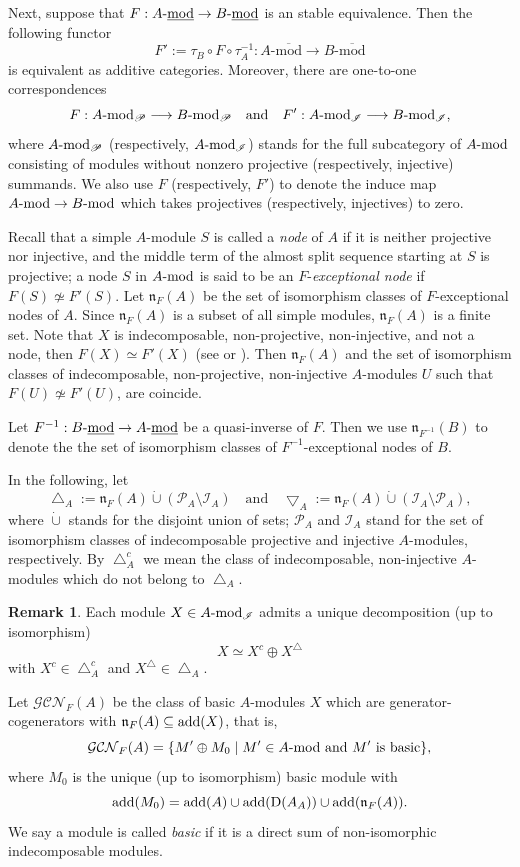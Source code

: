 \documentclass[12pt]{article}
\numberwithin{equation}{section}
\theoremstyle{definition}
\newtheorem{Rem}[Def]{Remark}
\newcommand{\add}{{\rm add}}
\newcommand{\DD}{{\rm D}}
\newcommand{\modcat}{\ensuremath{\mbox{{\rm -mod}}}}
\newcommand{\stmodcat}[1]{#1\mbox{{\rm -{\underline{mod}}}}}
\newcommand{\lra}{\longrightarrow}
\newcommand{\ra}{\rightarrow}
\begin{document}
Next, suppose that $F: \stmodcat{A} \ra \stmodcat{B}$ is an stable equivalence. Then the following functor
$$F':=\tau_B\circ F\circ \tau_A^{-1}:A\mbox{-}\overline{\mbox{mod}}\lra B\mbox{-}\overline{\mbox{mod}}$$
is equivalent as additive categories. Moreover, there are one-to-one correspondences
$$F: A\modcat_{\mathscr{P}}\lra B\modcat_{\mathscr{P}}\quad \mbox{and}\quad
F': A\modcat_{\mathscr{I}}\lra  B\modcat_{\mathscr{I}},$$
where $A\modcat_{\mathscr{P}}$ (respectively, $A\modcat_{\mathscr{I}}$) stands for the full subcategory of $A\modcat$ consisting of modules without nonzero projective (respectively, injective) summands.
We also use $F$ (respectively, $F'$) to denote the induce map $A\modcat\ra B\modcat$ which takes projectives (respectively, injectives) to zero.

Recall that a simple $A$-module $S$ is called a \emph{node} of $A$ if it is  neither projective nor injective, and the middle term of the almost split sequence starting at $S$ is projective; a node $S$ in $A\modcat$ is said to be an $F$-\emph{exceptional node} if $F(S)\not\simeq F'(S)$. Let $\mathfrak{n}_{F}(A)$ be the set of isomorphism classes of $F$-exceptional nodes of $A$. Since $\mathfrak{n}_{F}(A)$ is a subset of all simple modules, $\mathfrak{n}_{F}(A)$ is a finite set. Note that $X$ is indecomposable, non-projective, non-injective, and not a node, then $F(X)\simeq F'(X)$ (see \cite[Lemma 3.4]{ar78} or \cite[Chapter X.1.7, p. 340]{ars97}). Then $\mathfrak{n}_{F}(A)$ and the set of isomorphism classes
of indecomposable, non-projective, non-injective $A$-modules $U$ such that $F(U)\not\simeq F'(U)$, are coincide.

Let $F^{-1}:\stmodcat{B}\ra \stmodcat{A}$ be a quasi-inverse of $F$. Then we use $\mathfrak{n}_{F^{-1}}(B)$ to denote the the set of isomorphism classes of $F^{-1}$-exceptional nodes of $B$.

In the following, let $$\bigtriangleup_A
:=\mathfrak{n}_{F}(A)
\dot{\cup}(\mathscr{P}_A\setminus\mathscr{I}_A)
\quad\mbox{and}\quad \bigtriangledown_A
:=\mathfrak{n}_{F}(A)\dot{\cup}(\mathscr{I}_A\setminus\mathscr{P}_A),$$ where $\dot{\cup}$ stands for the disjoint union of sets; $\mathscr{P}_A$ and $\mathscr{I}_A$ stand for the set of isomorphism classes of indecomposable projective and injective $A$-modules, respectively. By $\bigtriangleup_A^c$ we mean the class of indecomposable, non-injective $A$-modules which do not belong to $\bigtriangleup_A$.

\begin{Rem}\label{rem-tri}
Each module $X\in A\modcat_{\mathscr{I}}$ admits a unique decomposition (up to isomorphism)
$$X\simeq X^{c}\oplus X^{\triangle}$$
with $X^{c}\in \bigtriangleup_A^c$ and $X^{\triangle}\in \bigtriangleup_A$.
\end{Rem}
Let $\mathcal{GCN}_{F}(A)$ be
the class of basic $A$-modules $X$ which are generator-cogenerators with  $\mathfrak{n}_{F}(A)\subseteq \add(X)$, that is,
$$\mathcal{GCN}_{F}(A)=\{M'\oplus M_0\mid M'\in A\modcat \mbox{ and }M' \mbox{ is basic} \},$$
where $M_0$ is the unique (up to isomorphism) basic module with $$\add(M_0)=\add(A)\cup\add(\DD(A_A))\cup\add(\mathfrak{n}_{F}(A)).$$
We say a module is called \emph{basic} if it is a direct sum of non-isomorphic indecomposable modules.
\end{document}
